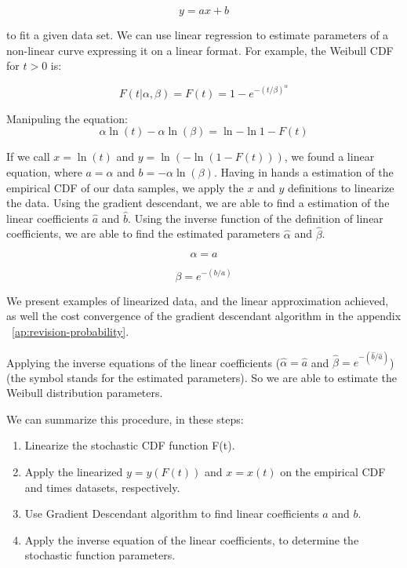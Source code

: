 \begin{equation}
y = ax + b
\end{equation}

to fit a given data set. We can use linear regression to estimate parameters of a non-linear curve expressing it on a linear format. For example, the Weibull CDF for $t > 0$ is:

\begin{equation}
F(t|\alpha, \beta) = F(t) = 1 - e^{-(t/\beta)^{\alpha}}
\end{equation}

Manipuling the equation:
\begin{equation}
\alpha\ln{(t)} - \alpha\ln{(\beta)} = \ln{-\ln{1 - F(t)}}
\end{equation}

If we call $x = \ln{(t)}$ and $y = \ln{(-\ln{(1 - F(t))})}$, we found a linear equation, where $a = \alpha$ and $b = -\alpha\ln{(\beta)}$. Having in hands a estimation of the empirical CDF of our data samples, we apply the $x$ and $y$ definitions to linearize the data. Using the gradient descendant, we are able to find a estimation of the linear coefficients $\hat{a}$ and $\hat{b}$. Using the inverse function of the definition of linear coefficients, we are able to find the estimated parameters $\hat{\alpha}$ and $\hat{\beta}$.

\begin{equation}
\alpha = a
\end{equation}

\begin{equation}
\beta = e^{-(b/a)}
\end{equation}

We present examples of linearized data, and the linear approximation achieved, as well the cost convergence of the gradient descendant algorithm in the appendix ~\ref{ap:revision-probability}.

Applying the inverse equations of the linear coefficients ($\hat{\alpha} = \hat{a}$ and $\hat{\beta} = e^{-(\hat{b}/\hat{a})}$) (the symbol stands for the estimated parameters). So we are able to estimate the Weibull distribution parameters.

We can summarize this procedure, in these steps:
\begin{enumerate}
\item Linearize the stochastic CDF function F(t).
\item Apply the linearized $y = y(F(t))$ and  $x = x(t)$ on the empirical CDF and times datasets, respectively. 
\item Use Gradient Descendant algorithm to find linear coefficients $a$ and $b$.
\item Apply the inverse equation of the linear coefficients, to determine the stochastic function parameters.
\end{enumerate}

